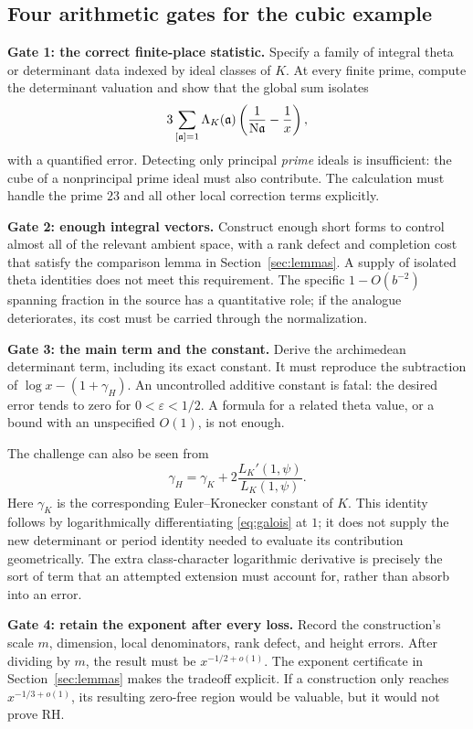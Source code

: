 \subsection{Four arithmetic gates for the cubic example}

\textbf{Gate 1: the correct finite-place statistic.}
Specify a family of integral theta or determinant data indexed by ideal classes of \(K\). At every finite prime, compute the determinant valuation and show that the global sum isolates
\[
3\sum_{[\mathfrak a]=1}\Lambda_K(\mathfrak a)
\left(\frac1{\mathrm{N}\mathfrak a}-\frac1x\right),
\]
with a quantified error. Detecting only principal \emph{prime} ideals is insufficient: the cube of a nonprincipal prime ideal must also contribute. The calculation must handle the prime \(23\) and all other local correction terms explicitly.

\textbf{Gate 2: enough integral vectors.}
Construct enough short forms to control almost all of the relevant ambient space, with a rank defect and completion cost that satisfy the comparison lemma in Section~\ref{sec:lemmas}. A supply of isolated theta identities does not meet this requirement. The specific \(1-O(b^{-2})\) spanning fraction in the source has a quantitative role; if the analogue deteriorates, its cost must be carried through the normalization.

\textbf{Gate 3: the main term and the constant.}
Derive the archimedean determinant term, including its exact constant. It must reproduce the subtraction of \(\log x-(1+\gamma_H)\). An uncontrolled additive constant is fatal: the desired error tends to zero for \(0<\varepsilon<1/2\). A formula for a related theta value, or a bound with an unspecified \(O(1)\), is not enough.

The challenge can also be seen from
\[
\gamma_H=\gamma_K+
2\frac{L_K'(1,\psi)}{L_K(1,\psi)}.
\]
Here \(\gamma_K\) is the corresponding Euler--Kronecker constant of \(K\). This identity follows by logarithmically differentiating \eqref{eq:galois} at \(1\); it does not supply the new determinant or period identity needed to evaluate its contribution geometrically. The extra class-character logarithmic derivative is precisely the sort of term that an attempted extension must account for, rather than absorb into an error.

\textbf{Gate 4: retain the exponent after every loss.}
Record the construction's scale \(m\), dimension, local denominators, rank defect, and height errors. After dividing by \(m\), the result must be \(x^{-1/2+o(1)}\). The exponent certificate in Section~\ref{sec:lemmas} makes the tradeoff explicit. If a construction only reaches \(x^{-1/3+o(1)}\), its resulting zero-free region would be valuable, but it would not prove RH.

